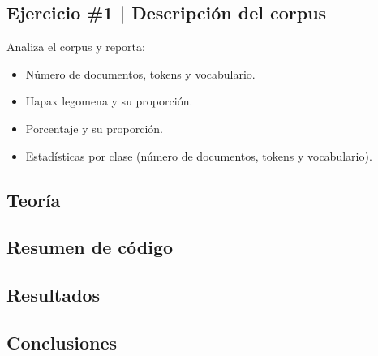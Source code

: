 \newpage

\begin{myblock}
\section*{Ejercicio \#1 | Descripción del corpus}

Analiza el corpus y reporta:\\

\begin{itemize}
    \item Número de documentos, tokens y vocabulario.
    \item Hapax legomena y su proporción.
    \item Porcentaje y su proporción.
    \item Estadísticas por clase (número de documentos, tokens y vocabulario).
\end{itemize}

\end{myblock}



\subsection{Teoría}

\subsection{Resumen de código}

\subsection{Resultados}

\subsection{Conclusiones}

\clearpage




